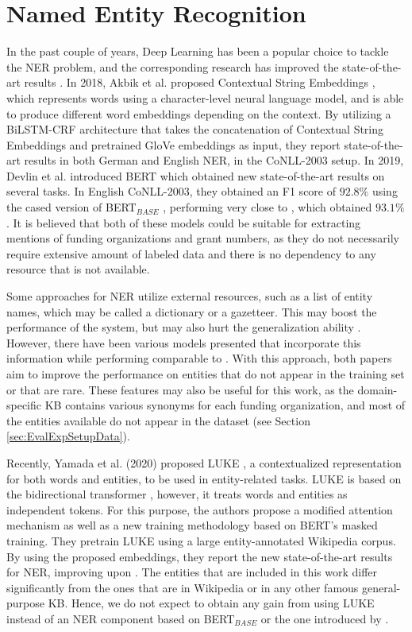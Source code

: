 \documentclass{report}
\theoremstyle{definition}
\theoremstyle{remark}
\begin{document}
\section{Named Entity Recognition}
\label{sota1}
In the past couple of years, Deep Learning has been a popular choice to tackle the NER problem, and the corresponding research has improved the state-of-the-art results \cite{NERsurvey}. In 2018, Akbik et al. proposed Contextual String Embeddings \cite{flairpaper}, which represents words using a character-level neural language model, and is able to produce different word embeddings depending on the context. By utilizing a BiLSTM-CRF architecture that takes the concatenation of Contextual String Embeddings and pretrained GloVe embeddings \cite{glove} as input, they report state-of-the-art results in both German and English NER, in the CoNLL-2003 \cite{conll} setup. In 2019, Devlin et al. introduced BERT \cite{BERT} which obtained new state-of-the-art results on several tasks. In English CoNLL-2003, they obtained an F1 score of $92.8\%$ using the cased version of BERT$_{BASE}$ \cite{BERT}, performing very close to \cite{flairpaper}, which obtained $93.1\%$. It is believed that both of these models could be suitable for extracting mentions of funding organizations and grant numbers, as they do not necessarily require extensive amount of labeled data and there is no dependency to any resource that is not available.

Some approaches for NER utilize external resources, such as a list of entity names, which may be called a dictionary or a gazetteer. This may boost the performance of the system, but may also hurt the generalization ability \cite{NERsurvey}. However, there have been various models presented \cite{NERgazetteer, NERDict} that incorporate this information while performing comparable to \cite{flairpaper}. With this approach, both papers \cite{NERgazetteer, NERDict} aim to improve the performance on entities that do not appear in the training set or that are rare. These features may also be useful for this work, as the domain-specific KB contains various synonyms for each funding organization, and most of the entities available do not appear in the dataset (see Section \ref{sec:EvalExpSetupData}).

Recently, Yamada et al. (2020) proposed LUKE \cite{LUKE}, a contextualized representation for both words and entities, to be used in entity-related tasks. LUKE is based on the bidirectional transformer \cite{transformer}, however, it treats words and entities as independent tokens. For this purpose, the authors propose a modified attention mechanism as well as a new training methodology based on BERT's masked training. They pretrain LUKE using a large entity-annotated Wikipedia corpus. By using the proposed embeddings, they report the new state-of-the-art results for NER, improving upon \cite{flairpaper}. The entities that are included in this work differ significantly from the ones that are in Wikipedia or in any other famous general-purpose KB. Hence, we do not expect to obtain any gain from using LUKE instead of an NER component based on BERT$_{BASE}$ or the one introduced by \cite{flairpaper}.
\end{document}
